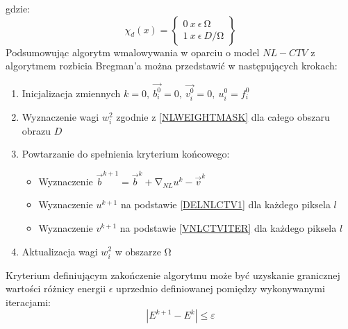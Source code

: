 \documentclass[12pt, twoside, openany]{report}
\theoremstyle{definition}
\begin{document}
gdzie:
\begin{equation}
{\chi }_d\left(x\right)=\left\{ \begin{array}{c}
0\ x\ \epsilon \ \mathrm{\Omega } \\ 
1\ x\ \epsilon \ D/\mathrm{\Omega } \end{array}
\right\}
\end{equation}
Podsumowując algorytm wmalowywania w oparciu o model $NL-CTV$ z algorytmem rozbicia Bregman’a można przedstawić w następujących krokach:
\begin{enumerate}
\item  
Inicjalizacja zmiennych $k=0,\ \overrightarrow{b^0_i}=0,\ \overrightarrow{v^0_i}=0,\ u^0_i=f^0_i$ 
\item  
Wyznaczenie wagi $w^2_i$ zgodnie z \eqref{NLWEIGHTMASK} dla całego obszaru obrazu $D$
\item  
Powtarzanie do spełnienia kryterium końcowego:
\begin{itemize}
\item
\noindent Wyznaczenie ${\overrightarrow{b}}^{k+1}={\overrightarrow{b}}^k+{\mathrm{\nabla }}_{NL}u^k-{\overrightarrow{v}}^k$
\item
\noindent Wyznaczenie $u^{k+1}$ na podstawie \eqref{DELNLCTV1} dla każdego piksela $l$
\item
\noindent Wyznaczenie $v^{k+1}$ na podstawie \eqref{VNLCTVITER} dla każdego piksela $l$
\end{itemize}
\item  
Aktualizacja wagi $w^2_i$ w obszarze $\mathrm{\Omega }$
\end{enumerate}
Kryterium definiującym zakończenie algorytmu może być uzyskanie granicznej wartości różnicy energii $\epsilon$ uprzednio definiowanej pomiędzy wykonywanymi iteracjami:
\begin{equation}
\left|E^{k+1}-E^k\right|\le \varepsilon
\end{equation}
\end{document}
